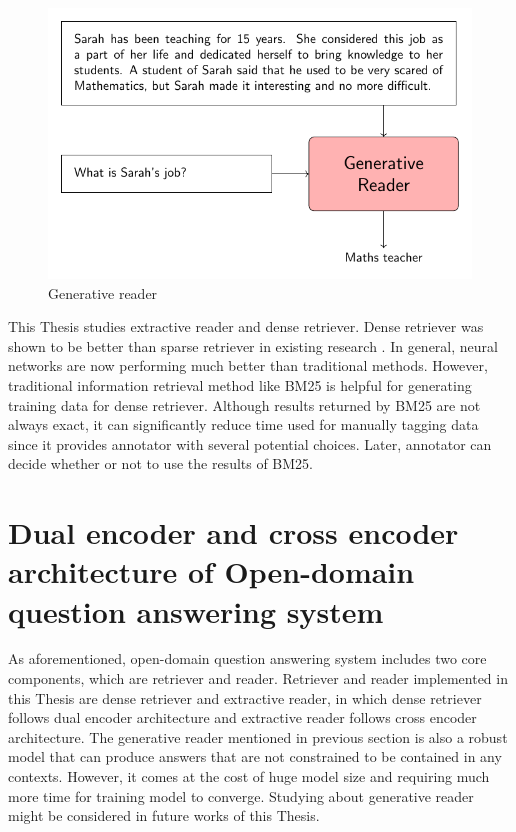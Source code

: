 \documentclass[12pt, sort&compress]{report}
\begin{document}
\begin{figure}
	\centering
	\includegraphics[scale=1.0]{images/PDF/generative_reader/generative_reader.pdf}
	\caption{Generative reader}
	\label{fig:03}
\end{figure}
This Thesis studies extractive reader and dense retriever. Dense retriever was shown to be better than sparse retriever in existing research \cite{karpukhin2020dense}. In general, neural networks are now performing much better than traditional methods. However, traditional information retrieval method like BM25 is helpful for generating training data for dense retriever. %
Although results returned by BM25 are not always exact, it can significantly reduce time used for manually tagging data since it provides annotator with several potential choices. Later, annotator can decide whether or not to use the results of BM25.
\section{Dual encoder and cross encoder architecture of Open-domain question answering system}
\label{sec:3.2}
As aforementioned, open-domain question answering system includes two core components, which are retriever and reader. Retriever and reader implemented in this Thesis are dense retriever and extractive reader, in which dense retriever follows dual encoder architecture and extractive reader follows cross encoder architecture. The generative reader mentioned in previous section is also a robust model that can produce answers that are not constrained to be contained in any contexts. However, it comes at the cost of huge model size and requiring much more time for training model to converge. Studying about generative reader might be considered in future works of this Thesis.
\end{document}
